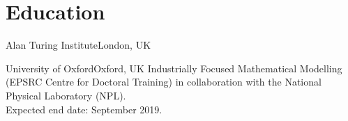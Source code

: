 \documentclass[11pt,a4paper,roman]{moderncv} %
\begin{document}


\section{Education}

        {Alan Turing Institute}{London, UK}{}{}

        {University of Oxford}{Oxford, UK}{}
        {
          Industrially Focused Mathematical Modelling 
          (EPSRC Centre for Doctoral Training) 
          in collaboration with the National Physical Laboratory (NPL). \\ 
          Expected end date: September 2019.
        }
%
%
%

\end{document}
